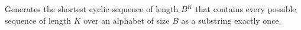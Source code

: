 
Generates the shortest cyclic sequence of length $B^K$ that contains every possible sequence of length $K$ over an alphabet of size $B$ as a substring exactly once.


